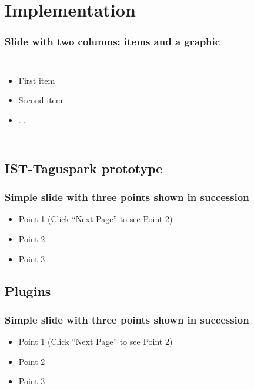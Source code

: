 \documentclass[]{beamer}
\begin{document}
\section{Implementation}

\begin{frame}
  \frametitle{Slide with two columns: items and a graphic}   %
  \begin{columns}[c]
  \column{2in}  %
  \begin{itemize}
  \item<1-> First item
  \item<2-> Second item
  \item<3-> ...
  \end{itemize}
  \column{2in}
  \end{columns}
\end{frame}


\subsection{IST-Taguspark prototype}

\begin{frame}
  \frametitle{Simple slide with three points shown in succession}   %

  \begin{itemize}
  \item<1-> Point 1 (Click ``Next Page'' to see Point 2) %
  \item<2-> Point 2  %
  \item<3-> Point 3
  \end{itemize}
\end{frame}

\subsection{Plugins}

\begin{frame}
  \frametitle{Simple slide with three points shown in succession}   %

  \begin{itemize}
  \item<1-> Point 1 (Click ``Next Page'' to see Point 2) %
  \item<2-> Point 2  %
  \item<3-> Point 3
  \end{itemize}
\end{frame}
\end{document}
